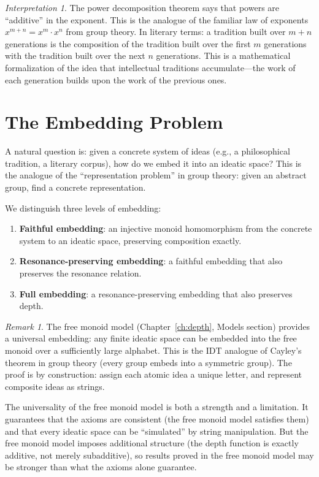 \documentclass[11pt,openany]{book}
\theoremstyle{definition}
\theoremstyle{plain}
\theoremstyle{remark}
\newtheorem{remark}[axiom]{Remark}
\newtheorem{interpretation}[axiom]{Interpretation}
\begin{document}
\begin{interpretation}
The power decomposition theorem says that powers are ``additive'' in the exponent. This is the analogue of the familiar law of exponents $x^{m+n} = x^m \cdot x^n$ from group theory. In literary terms: a tradition built over $m + n$ generations is the composition of the tradition built over the first $m$ generations with the tradition built over the next $n$ generations. This is a mathematical formalization of the idea that intellectual traditions accumulate---the work of each generation builds upon the work of the previous ones.
\end{interpretation}

\section{The Embedding Problem}

A natural question is: given a concrete system of ideas (e.g., a philosophical tradition, a literary corpus), how do we embed it into an ideatic space? This is the analogue of the ``representation problem'' in group theory: given an abstract group, find a concrete representation.

We distinguish three levels of embedding:
\begin{enumerate}
\item \textbf{Faithful embedding}: an injective monoid homomorphism from the concrete system to an ideatic space, preserving composition exactly.
\item \textbf{Resonance-preserving embedding}: a faithful embedding that also preserves the resonance relation.
\item \textbf{Full embedding}: a resonance-preserving embedding that also preserves depth.
\end{enumerate}

\begin{remark}
The free monoid model (Chapter~\ref{ch:depth}, Models section) provides a universal embedding: any finite ideatic space can be embedded into the free monoid over a sufficiently large alphabet. This is the IDT analogue of Cayley's theorem in group theory (every group embeds into a symmetric group). The proof is by construction: assign each atomic idea a unique letter, and represent composite ideas as strings.

The universality of the free monoid model is both a strength and a limitation. It guarantees that the axioms are consistent (the free monoid model satisfies them) and that every ideatic space can be ``simulated'' by string manipulation. But the free monoid model imposes additional structure (the depth function is exactly additive, not merely subadditive), so results proved in the free monoid model may be stronger than what the axioms alone guarantee.
\end{remark}
\end{document}
